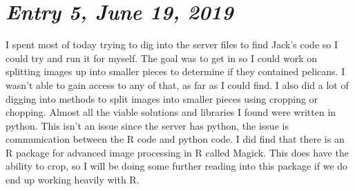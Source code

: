 \documentclass{article}
\begin{document}
\section{\Large \itshape Entry 5, June 19, 2019}
	I spent most of today trying to dig into the server files to find Jack's code so I could try and run it for myself.
The goal was to get in so I could work on splitting images up into smaller pieces to determine if they contained pelicans. I wasn't able to gain access to any of that, as far as I could find.
I also did a lot of digging into methods to split images into smaller pieces using cropping or chopping. Almost all the viable solutions and libraries I found were written in python. This isn't an issue since the server has python, the issue is communication between the R code and python code.
I did find that there is an R package for advanced image processing in R called Magick. This does have the ability to crop, so I will be doing some further reading into this package if we do end up working heavily with R.		
\end{document}
